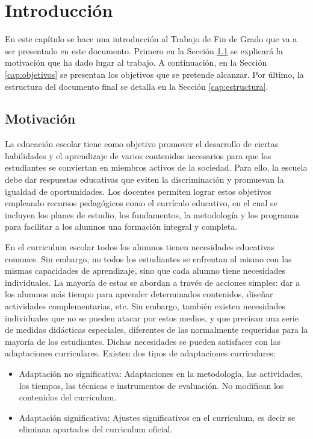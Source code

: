 \chapter{Introducción}
\label{ch:introduccion}

En este capítulo se hace una introducción al Trabajo de Fin de Grado que va a ser presentado en este documento. Primero en la Sección \ref{cap:motivacio} se explicará la motivación que ha dado lugar al trabajo. A continuación, en la Sección \ref{cap:objetivos} se presentan los objetivos que se pretende alcanzar. Por último, la estructura del documento final se detalla en la Sección \ref{cap:estructura}.

\section{Motivación}\label{cap:motivacio}
La educación escolar tiene como objetivo promover el desarrollo de ciertas habilidades y el aprendizaje de varios contenidos necesarios para que los estudiantes se conviertan en miembros activos de la sociedad. Para ello, la escuela debe dar respuestas educativas que eviten la discriminación y promuevan la igualdad de oportunidades. Los docentes permiten lograr estos objetivos empleando recursos pedagógicos como el currículo educativo, en el cual se incluyen los planes de estudio, los fundamentos, la metodología y los programas para facilitar a los alumnos una formación integral y completa.

En el curriculum escolar todos los alumnos tienen necesidades educativas comunes. Sin embargo, no todos los estudiantes se enfrentan al mismo con las mismas capacidades de aprendizaje, sino que cada alumno tiene necesidades individuales. La mayoría de estas se abordan a través de acciones simples: dar a los alumnos más tiempo para aprender determinados contenidos, diseñar actividades complementarias, etc.  Sin embargo, también existen necesidades individuales que no se pueden atacar por estos medios, y que precisan una serie de medidas didácticas especiales, diferentes de las normalmente requeridas para la mayoría de los estudiantes. Dichas necesidades se pueden satisfacer con las adaptaciones curriculares. Existen dos tipos de adaptaciones curriculares:
\begin{itemize}
    \item Adaptación no significativa: Adaptaciones en la metodología, las actividades, los tiempos, las técnicas e instrumentos de evaluación. No modifican los contenidos del curriculum.  
    \item Adaptación significativa: Ajustes significativos en el curriculum, es decir se eliminan apartados del curriculum oficial. 
\end{itemize}

